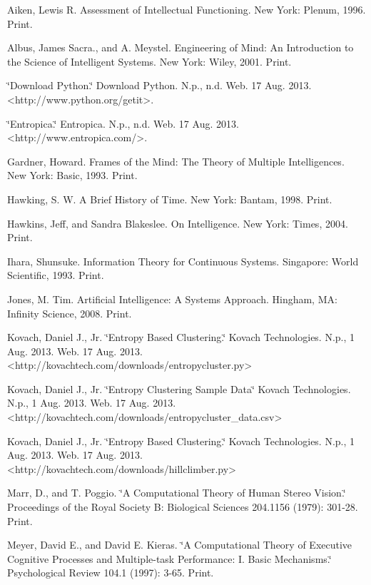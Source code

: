 \documentclass[english]{article}
\begin{document}
\begin{thebibliography}{10}
Aiken, Lewis R. Assessment of Intellectual Functioning.
New York: Plenum, 1996. Print.

Albus, James Sacra., and A. Meystel. Engineering of
Mind: An Introduction to the Science of Intelligent Systems. New York:
Wiley, 2001. Print.

\char`\"{}Download Python.\char`\"{} Download Python.
N.p., n.d. Web. 17 Aug. 2013. \textless{}http://www.python.org/getit\textgreater{}.

\char`\"{}Entropica.\char`\"{} Entropica. N.p., n.d.
Web. 17 Aug. 2013. \textless{}http://www.entropica.com/\textgreater{}.

Gardner, Howard. Frames of the Mind: The Theory of Multiple
Intelligences. New York: Basic, 1993. Print.

Hawking, S. W. A Brief History of Time. New York: Bantam,
1998. Print.

Hawkins, Jeff, and Sandra Blakeslee. On Intelligence.
New York: Times, 2004. Print. 

Ihara, Shunsuke. Information Theory for Continuous Systems.
Singapore: World Scientific, 1993. Print.

Jones, M. Tim. Artificial Intelligence: A Systems Approach.
Hingham, MA: Infinity Science, 2008. Print. 

Kovach, Daniel J., Jr. \char`\"{}Entropy Based Clustering.\char`\"{}
Kovach Technologies. N.p., 1 Aug. 2013. Web. 17 Aug. 2013.\textless{}http://kovachtech.com/downloads/entropycluster.py\textgreater{}

Kovach, Daniel J., Jr. \char`\"{}Entropy Clustering
Sample Data\char`\"{} Kovach Technologies. N.p., 1 Aug. 2013. Web.
17 Aug. 2013. \textless{}http://kovachtech.com/downloads/entropycluster\_data.csv\textgreater{}

Kovach, Daniel J., Jr. \char`\"{}Entropy Based Clustering.\char`\"{}
Kovach Technologies. N.p., 1 Aug. 2013. Web. 17 Aug. 2013.\textless{}http://kovachtech.com/downloads/hillclimber.py\textgreater{}

Marr, D., and T. Poggio. \char`\"{}A Computational
Theory of Human Stereo Vision.\char`\"{} Proceedings of the Royal
Society B: Biological Sciences 204.1156 (1979): 301-28. Print.

Meyer, David E., and David E. Kieras. \char`\"{}A
Computational Theory of Executive Cognitive Processes and Multiple-task
Performance: I. Basic Mechanisms.\char`\"{} Psychological Review 104.1
(1997): 3-65. Print.


\end{thebibliography}
\end{document}
